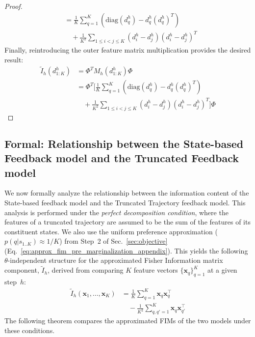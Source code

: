 \documentclass{article}
\begin{document}
\begin{proof}
\begin{align*}
&= \frac{1}{K} \sum_{q=1}^K \left( \mathrm{diag}(d^h_q) - d^h_q (d^h_q)^T \right) \\
&\quad + \frac{1}{K^2} \sum_{1 \le i < j \le K} (d^h_i - d^h_j)(d^h_i - d^h_j)^T
\end{align*}
Finally, reintroducing the outer feature matrix multiplication provides the desired result:
\begin{align*}
\tilde{I}_h(d_{1:K}^h) &= \Phi^T M_h(d_{1:K}^h) \Phi \\
&= \Phi^T \Bigg[ \frac{1}{K} \sum_{q=1}^K \left( \mathrm{diag}(d^h_q) - d^h_q (d^h_q)^T \right) \\
&\quad + \frac{1}{K^2} \sum_{1 \le i < j \le K} (d^h_i - d^h_j)(d^h_i - d^h_j)^T \Bigg] \Phi
\end{align*}
\end{proof}

\subsection{Formal: Relationship between the State-based Feedback model and the Truncated Feedback model}
\label{sec:fim_relationship_state_truncated}

We now formally analyze the relationship between the information content of the State-based feedback model and the Truncated Trajectory feedback model. This analysis is performed under the \textit{perfect decomposition condition}, where the features of a truncated trajectory are assumed to be the sum of the features of its constituent states. We also use the uniform preference approximation ($p(q|s_{1..K}) \approx 1/K$) from Step~2 of Sec.~\ref{sec:objective} (Eq.~\ref{eq:approx_fim_pre_marginalization_appendix}). This yields the following $\theta$-independent structure for the approximated Fisher Information matrix component, $\tilde{I}_h$, derived from comparing $K$ feature vectors $\{\mathbf{x}_q\}_{q=1}^K$ at a given step~$h$:
\begin{align*}
\tilde{I}_h(\mathbf{x}_1, \dots, \mathbf{x}_K)
&= \frac{1}{K} \sum_{q=1}^K \mathbf{x}_q \mathbf{x}_q^\top \\
&\quad - \frac{1}{K^2} \sum_{q,q'=1}^K \mathbf{x}_q \mathbf{x}_{q'}^\top
\end{align*}
The following theorem compares the approximated FIMs of the two models under these conditions.
\end{document}
